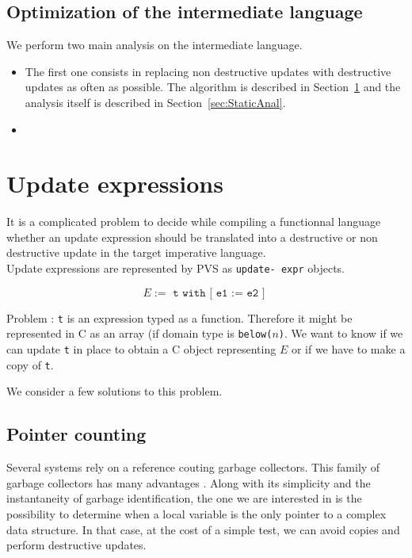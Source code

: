\documentclass[12pt,a4paper]{article}
\newcommand{\cl}[1]{\texttt{#1}}
\begin{document}
\subsection{Optimization of the intermediate language}

We perform two main analysis on the intermediate language.
\begin{itemize}
\item The first one consists in replacing non destructive updates with destructive updates as often as possible. The algorithm is described in Section~\ref{sec:UpdateExpr} and the analysis itself is described in Section~\ref{sec:StaticAnal}.
\item 
\end{itemize}



\section{Update expressions}
\label{sec:UpdateExpr}

 It is a complicated problem to decide while compiling a functionnal language whether an update expression should be translated into a destructive or non destructive update in the target imperative language.\\

Update expressions are represented by PVS as \texttt{update-
expr} objects.

$$ E := \texttt{ t with [ e1 := e2 ] } $$

Problem :
\cl{t} is an expression typed as a function. Therefore it might be represented in C as an array (if domain type is \cl{below($n$)}.
We want to know if we can update \cl{t} in place to obtain a C object representing $E$ or if we have to make a copy of \cl{t}.


We consider a few solutions to this problem.


\subsection{Pointer counting}

Several systems rely on a reference couting garbage collectors. This family of garbage collectors has many advantages \cite{jonesgarbage}. Along with its simplicity and the instantaneity of garbage identification, the one we are interested in is the possibility to determine when a local variable is the only pointer to a complex data structure. In that case, at the cost of a simple test, we can avoid copies and perform destructive updates. \\
\end{document}
